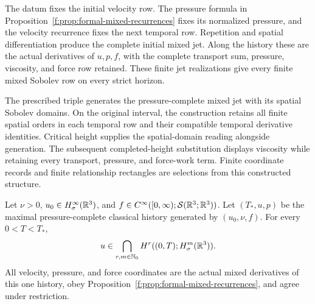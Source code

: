 The datum fixes the initial velocity row. The pressure formula in
Proposition~\ref{f:prop:formal-mixed-recurrences} fixes its normalized pressure,
and the velocity recurrence fixes the next temporal row. Repetition and
spatial differentiation produce the complete initial mixed jet. Along the
history these are the actual derivatives of \(u,p,f\), with the complete
transport sum, pressure, viscosity, and force row retained. These finite jet
realizations give every finite mixed Sobolev row on every strict horizon.

The prescribed triple generates the pressure-complete mixed jet with its
spatial Sobolev domains. On the original interval, the construction retains
all finite spatial orders in each temporal row and their compatible temporal
derivative identities. Critical height supplies the spatial-domain reading
alongside generation. The subsequent completed-height substitution displays
viscosity while retaining every transport, pressure, and force-work term.
Finite coordinate records and finite relationship rectangles are selections
from this constructed structure.

\begin{theorem}
\label{f:thm:strict-datum-intersection}
Let \(\nu>0\), \(u_0\in H^\infty_\sigma(\mathbb R^3)\), and
\(f\in C^\infty([0,\infty);\mathcal S(\mathbb R^3;\mathbb R^3))\). Let
\((T_*,u,p)\) be the maximal pressure-complete classical history generated
by \((u_0,\nu,f)\). For every \(0<T<T_*\),
\begin{equation}
 u\in\bigcap_{r,m\in\mathbb N_0}H^r((0,T);H^m_\sigma(\mathbb R^3)).
 \label{f:eq:strict-independent-mixed-intersection}
\end{equation}
All velocity, pressure, and force coordinates are the actual mixed
derivatives of this one history, obey
Proposition~\ref{f:prop:formal-mixed-recurrences}, and agree under restriction.
\end{theorem}

